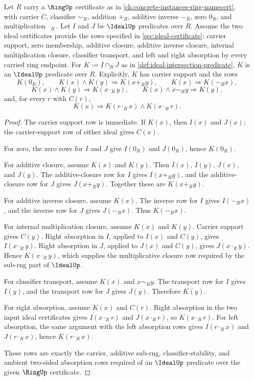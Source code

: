 \begin{theorem}
\label{thm:ideal-intersection-closure}
Let $R$ carry a $\RingUp$ certificate as in \autoref{ch:concrete-instances-ring-namecert}, with carrier $C$, classifier $\sim_R$, addition $+_R$, additive inverse $-_R$, zero $0_R$, and multiplication $\cdot_R$. Let $I$ and $J$ be $\IdealUp$ predicates over $R$. Assume the two ideal certificates provide the rows specified in \autoref{sec:ideal-certificate}: carrier support, zero membership, additive closure, additive inverse closure, internal multiplication closure, classifier transport, and left and right absorption by every carried ring endpoint. For $K:=I\cap_RJ$ as in \autoref{def:ideal-intersection-predicate}, $K$ is an $\IdealUp$ predicate over $R$. Explicitly, $K$ has carrier support and the rows
$$
K(0_R),\qquad
K(x)\land K(y)\Longrightarrow K(x+_R y),\qquad
K(x)\Longrightarrow K(-_R x),
$$
$$
K(x)\land K(y)\Longrightarrow K(x\cdot_R y),\qquad
K(x)\land x\sim_R y\Longrightarrow K(y),
$$
and, for every $r$ with $C(r)$,
$$
K(x)\Longrightarrow K(r\cdot_R x)\land K(x\cdot_R r).
$$
\end{theorem}
\begin{proof}
The carrier support row is immediate. If $K(x)$, then $I(x)$ and $J(x)$; the carrier-support row of either ideal gives $C(x)$.

For zero, the zero rows for $I$ and $J$ give $I(0_R)$ and $J(0_R)$, hence $K(0_R)$.

For additive closure, assume $K(x)$ and $K(y)$. Then $I(x)$, $I(y)$, $J(x)$, and $J(y)$. The additive-closure row for $I$ gives $I(x+_R y)$, and the additive-closure row for $J$ gives $J(x+_R y)$. Together these are $K(x+_R y)$.

For additive inverse closure, assume $K(x)$. The inverse row for $I$ gives $I(-_R x)$, and the inverse row for $J$ gives $J(-_R x)$. Thus $K(-_R x)$.

For internal multiplication closure, assume $K(x)$ and $K(y)$. Carrier support gives $C(y)$. Right absorption in $I$, applied to $I(x)$ and $C(y)$, gives $I(x\cdot_R y)$. Right absorption in $J$, applied to $J(x)$ and $C(y)$, gives $J(x\cdot_R y)$. Hence $K(x\cdot_R y)$, which supplies the multiplicative closure row required by the sub-rng part of $\IdealUp$.

For classifier transport, assume $K(x)$ and $x\sim_R y$. The transport row for $I$ gives $I(y)$, and the transport row for $J$ gives $J(y)$. Therefore $K(y)$.

For right absorption, assume $K(x)$ and $C(r)$. Right absorption in the two input ideal certificates gives $I(x\cdot_R r)$ and $J(x\cdot_R r)$, so $K(x\cdot_R r)$. For left absorption, the same argument with the left absorption rows gives $I(r\cdot_R x)$ and $J(r\cdot_R x)$, hence $K(r\cdot_R x)$.

These rows are exactly the carrier, additive sub-rng, classifier-stability, and ambient two-sided absorption rows required of an $\IdealUp$ predicate over the given $\RingUp$ certificate.
\end{proof}

